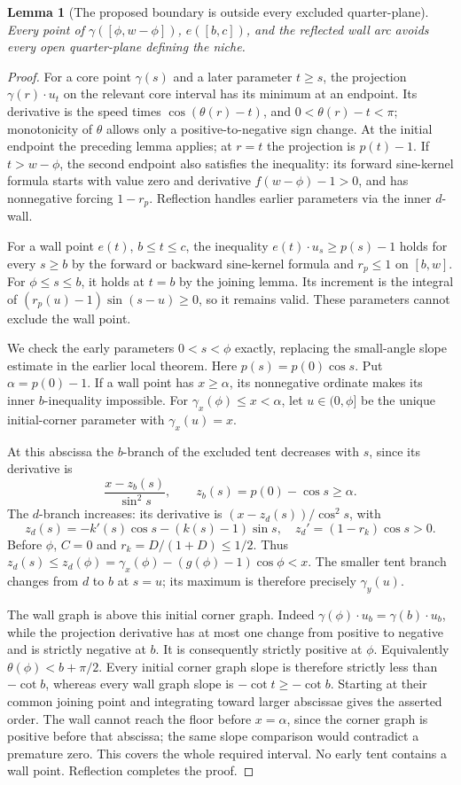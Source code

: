 \documentclass[11pt]{article}
\newtheorem{lemma}[theorem]{Lemma}
\begin{document}
\begin{lemma}[The proposed boundary is outside every excluded quarter-plane]\label{lem:exposure}
Every point of $\gamma([\phi,w-\phi])$, $e([b,c])$, and the reflected wall arc avoids every open quarter-plane defining the niche.
\end{lemma}
\begin{proof}
For a core point $\gamma(s)$ and a later parameter $t\ge s$, the projection $\gamma(r)\cdot u_t$ on the relevant core interval has its minimum at an endpoint. Its derivative is the speed times $\cos(\theta(r)-t)$, and $0<\theta(r)-t<\pi$; monotonicity of $\theta$ allows only a positive-to-negative sign change. At the initial endpoint the preceding lemma applies; at $r=t$ the projection is $p(t)-1$. If $t>w-\phi$, the second endpoint also satisfies the inequality: its forward sine-kernel formula starts with value zero and derivative $f(w-\phi)-1>0$, and has nonnegative forcing $1-r_p$. Reflection handles earlier parameters via the inner $d$-wall.

For a wall point $e(t)$, $b\le t\le c$, the inequality $e(t)\cdot u_s\ge p(s)-1$ holds for every $s\ge b$ by the forward or backward sine-kernel formula and $r_p\le1$ on $[b,w]$. For $\phi\le s\le b$, it holds at $t=b$ by the joining lemma. Its increment is the integral of $(r_p(u)-1)\sin(s-u)\ge0$, so it remains valid. These parameters cannot exclude the wall point.

We check the early parameters $0<s<\phi$ exactly, replacing the small-angle slope estimate in the earlier local theorem. Here $p(s)=p(0)\cos s$. Put $\alpha=p(0)-1$. If a wall point has $x\ge\alpha$, its nonnegative ordinate makes its inner $b$-inequality impossible. For $\gamma_x(\phi)\le x<\alpha$, let $u\in(0,\phi]$ be the unique initial-corner parameter with $\gamma_x(u)=x$.

At this abscissa the $b$-branch of the excluded tent decreases with $s$, since its derivative is
\[
 \frac{x-z_b(s)}{\sin^2s},\qquad z_b(s)=p(0)-\cos s\ge\alpha.
\]
The $d$-branch increases: its derivative is $(x-z_d(s))/\cos^2s$, with
\[
 z_d(s)=-k'(s)\cos s-(k(s)-1)\sin s,\quad z_d'=(1-r_k)\cos s>0.
\]
Before $\phi$, $C=0$ and $r_k=D/(1+D)\le1/2$. Thus
$z_d(s)\le z_d(\phi)=\gamma_x(\phi)-(g(\phi)-1)\cos\phi< x$.
The smaller tent branch changes from $d$ to $b$ at $s=u$; its maximum is therefore precisely $\gamma_y(u)$.

The wall graph is above this initial corner graph. Indeed $\gamma(\phi)\cdot u_b=\gamma(b)\cdot u_b$, while the projection derivative has at most one change from positive to negative and is strictly negative at $b$. It is consequently strictly positive at $\phi$. Equivalently $\theta(\phi)<b+\pi/2$. Every initial corner graph slope is therefore strictly less than $-\cot b$, whereas every wall graph slope is $-\cot t\ge-\cot b$. Starting at their common joining point and integrating toward larger abscissae gives the asserted order. The wall cannot reach the floor before $x=\alpha$, since the corner graph is positive before that abscissa; the same slope comparison would contradict a premature zero. This covers the whole required interval. No early tent contains a wall point. Reflection completes the proof.
\end{proof}
\end{document}
